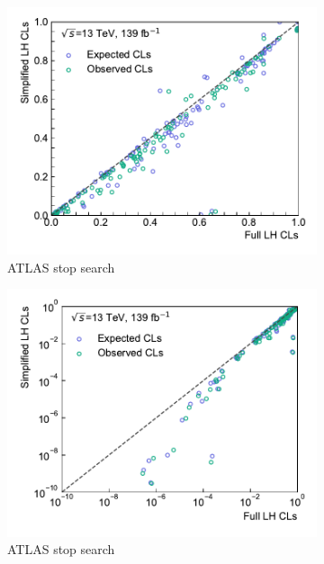 \begin{figure}
\begin{subfigure}[b]{0.5\textwidth}
		\centering\includegraphics[width=\textwidth]{cls_scatter_stop1L_lin}
	\caption{ATLAS stop search~\cite{SUSY-2018-07}}
	\end{subfigure}\hfill
	\begin{subfigure}[b]{0.5\textwidth}
		\centering\includegraphics[width=\textwidth]{cls_scatter_stop1L_log}
		\caption{ATLAS stop search~\cite{SUSY-2018-07}}
	\end{subfigure}\hfill
	\begin{subfigure}[b]{0.5\textwidth}

\end{subfigure}
\end{figure}
